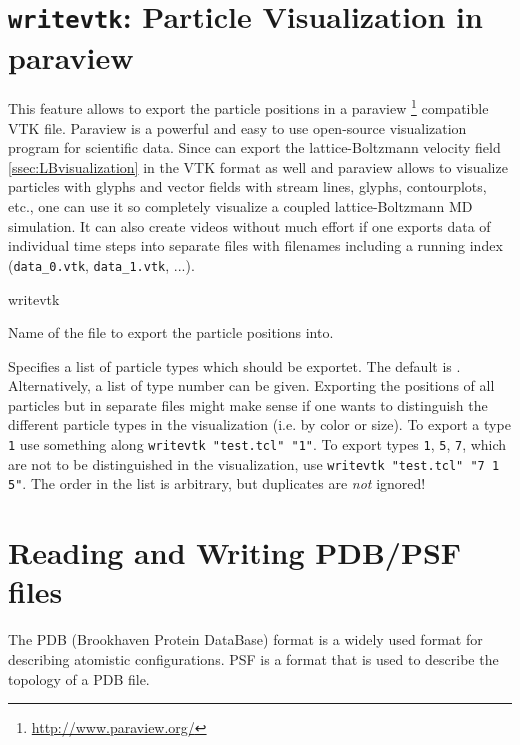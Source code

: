 \section{\texttt{writevtk}: Particle Visualization in paraview}
\label{sec:writevtk}

This feature allows to export the particle positions in a paraview
\footnote{\url{http://www.paraview.org/}} compatible VTK
file. Paraview is a powerful and easy to use open-source visualization
program for scientific data. Since \es can export the
lattice-Boltzmann velocity field \ref{ssec:LBvisualization} in the VTK
format as well and paraview allows to visualize particles with glyphs
and vector fields with stream lines, glyphs, contourplots, etc., one
can use it so completely visualize a coupled lattice-Boltzmann MD
simulation. It can also create videos without much effort if one
exports data of individual time steps into separate files with
filenames including a running index (\texttt{data_0.vtk},
\texttt{data_1.vtk}, ...).

\begin{essyntax}
  writevtk  
\end{essyntax}

\begin{arguments}
\item[\var{filename}]
  Name of the file to export the particle positions into.
\item[\opt{\alt{all \asep \var{type}}}] Specifies a list of particle
  types which should be exportet. The default is
  . Alternatively, a list of type number can be
  given. Exporting the positions of all particles but in separate
  files might make sense if one wants to distinguish the different
  particle types in the visualization (i.e. by color or size).  To
  export a type \texttt{1} use something along \texttt{writevtk
    "test.tcl" "1"}.  To export types \texttt{1}, \texttt{5},
  \texttt{7}, which are not to be distinguished in the visualization,
  use \texttt{writevtk "test.tcl" "7 1 5"}.  The order in the list is
  arbitrary, but duplicates are \emph{not} ignored!
\end{arguments}

\section{Reading and Writing PDB/PSF files}
The PDB (Brookhaven Protein DataBase) format is a widely used format
for describing atomistic configurations. PSF is a format that is used
to describe the topology of a PDB file. 


